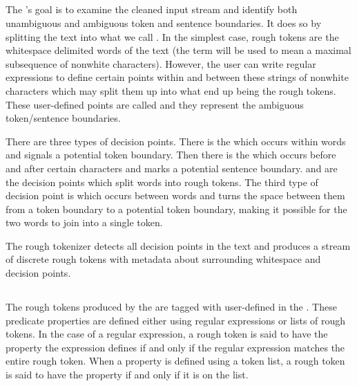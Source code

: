 \subsection{}
\label{ssec:impl-overview-roughtokenizer}

The 's goal is to examine the cleaned input stream and
identify both unambiguous and ambiguous token and sentence boundaries. It does
so by splitting the text into what we call . In the
simplest case, rough tokens are the whitespace delimited words of the text (the
term  will be used to mean a maximal subsequence of nonwhite
characters). However, the user can write regular expressions to define certain
points within and between these strings of nonwhite characters which may split
them up into what end up being the rough tokens. These user-defined points are
called  and they represent the ambiguous
token/sentence boundaries.

There are three types of decision points. There is the \maysplit{} which occurs
within words and signals a potential token boundary. Then there is the
\maybreaksentence{} which occurs before and after certain characters and marks
a potential sentence boundary. \maysplit{} and \maybreaksentence{} are the
decision points which split words into rough tokens. The third type of decision
point is \mayjoin{} which occurs between words and turns the space between them
from a token boundary to a potential token boundary, making it possible for the
two words to join into a single token.

The rough tokenizer detects all decision points in the text and produces a
stream of discrete rough tokens with metadata about surrounding whitespace and
decision points.

\subsection{}
\label{ssec:impl-overview-featureextractor}

The rough tokens produced by the  are tagged with
user-defined  in the . These
predicate properties are defined either using regular expressions or lists of
rough tokens. In the case of a regular expression, a rough token is said to
have the property the expression defines if and only if the regular expression
matches the entire rough token. When a property is defined using a token list,
a rough token is said to have the property if and only if it is on the list.

